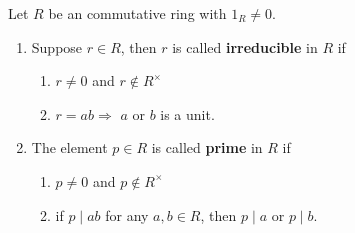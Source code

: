 \begin{definition}
    Let $R$ be an commutative ring with $1_R\neq 0$.

    \begin{enumerate}
        \item  Suppose $r \in R$, then $r$ is called \textbf{irreducible} in $R$ if
              \begin{enumerate}[label=(\roman*)]
                  \item $r \neq 0$ and $r \notin R^\times$
                  \item $r=ab \Rightarrow$ $a$ or $b$ is a unit.
              \end{enumerate}

        \item  The element $p \in R$ is called \textbf{prime} in $R$ if
              \begin{enumerate}[label=(\roman*)]
                  \item $p\neq 0$ and $p \not\in R^\times$
                  \item if $p \mid a b$ for any $a, b \in R$, then $p \mid a$ or $p \mid b$.
              \end{enumerate}
    \end{enumerate}
\end{definition}

